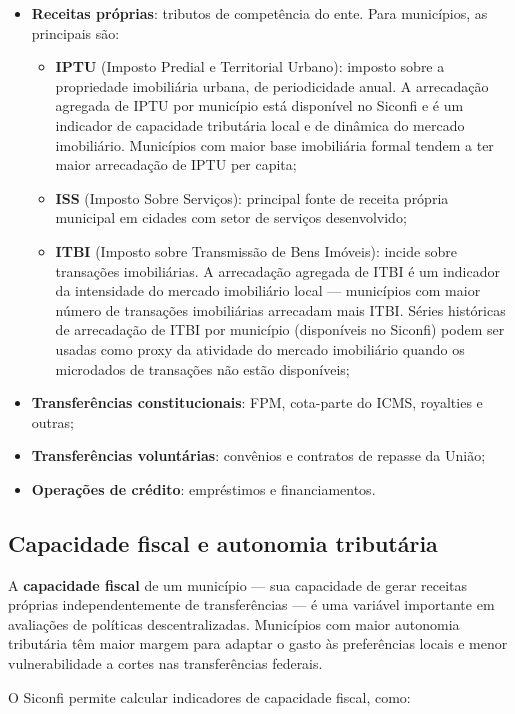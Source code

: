 \begin{itemize}
  \item \textbf{Receitas próprias}: tributos de competência do ente. Para municípios, as principais são:
  \begin{itemize}
    \item \textbf{IPTU} (Imposto Predial e Territorial Urbano): imposto sobre a propriedade imobiliária urbana, de periodicidade anual. A arrecadação agregada de IPTU por município está disponível no Siconfi e é um indicador de capacidade tributária local e de dinâmica do mercado imobiliário. Municípios com maior base imobiliária formal tendem a ter maior arrecadação de IPTU per capita;
    \item \textbf{ISS} (Imposto Sobre Serviços): principal fonte de receita própria municipal em cidades com setor de serviços desenvolvido;
    \item \textbf{ITBI} (Imposto sobre Transmissão de Bens Imóveis): incide sobre transações imobiliárias. A arrecadação agregada de ITBI é um indicador da intensidade do mercado imobiliário local --- municípios com maior número de transações imobiliárias arrecadam mais ITBI. Séries históricas de arrecadação de ITBI por município (disponíveis no Siconfi) podem ser usadas como proxy da atividade do mercado imobiliário quando os microdados de transações não estão disponíveis;
  \end{itemize}
  \item \textbf{Transferências constitucionais}: FPM, cota-parte do ICMS, royalties e outras;
  \item \textbf{Transferências voluntárias}: convênios e contratos de repasse da União;
  \item \textbf{Operações de crédito}: empréstimos e financiamentos.
\end{itemize}

\subsection{Capacidade fiscal e autonomia tributária}

A \textbf{capacidade fiscal} de um município --- sua capacidade de gerar receitas próprias independentemente de transferências --- é uma variável importante em avaliações de políticas descentralizadas. Municípios com maior autonomia tributária têm maior margem para adaptar o gasto às preferências locais e menor vulnerabilidade a cortes nas transferências federais.

O Siconfi permite calcular indicadores de capacidade fiscal, como:

